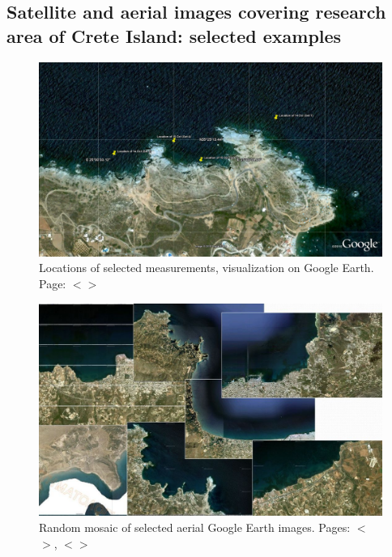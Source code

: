 \documentclass[11pt]{article}
\begin{document}
\begin{appendices}
\subsection{Satellite and aerial images covering research area of Crete Island: selected examples}

\begin{figure}[H]
	\begin{center}
		\includegraphics[scale=0.20]{Locations_Meas.jpg}
		\caption{Locations of selected measurements, visualization on Google Earth­. Page: $<$\pageref{page-47}$>$}\label{fig:A.36}
	\end{center}	
\end{figure}

\begin{figure}[H]
	\begin{center}
		\includegraphics[scale=0.30]{App-8.jpg}
		\caption{Random mosaic of selected aerial Google Earth images. Pages: $<$\pageref{page-30}$>$, $<$\pageref{page-47}$>$}\label{fig:A.37}	
	\end{center}	
\end{figure}
\pagebreak


\end{appendices}
\end{document}

